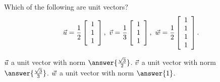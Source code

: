 \documentclass{ximera}
\author{Zack Reed}
\begin{document}
\begin{exercise}

Which of the following are unit vectors?
\begin{equation*}
  \vect{u}=\frac{1}{2}\startmat{c}1\\1\\1\stopmat, \quad
  \vect{v}=\frac{1}{3}\startmat{c}1\\1\\1\stopmat, \quad
  \vect{w}=\frac{1}{2}\startmat{c}1\\1\\1\\1\stopmat.
\end{equation*}

$\vect{u}$  a unit vector with norm $\answer{\frac{\sqrt{3}}{2}}$. $\vect{v}$  a unit vector with norm $\answer{\frac{\sqrt{3}}{3}}$. $\vect{w}$  a unit vector with norm $\answer{1}$.

\end{exercise}
\end{document}
